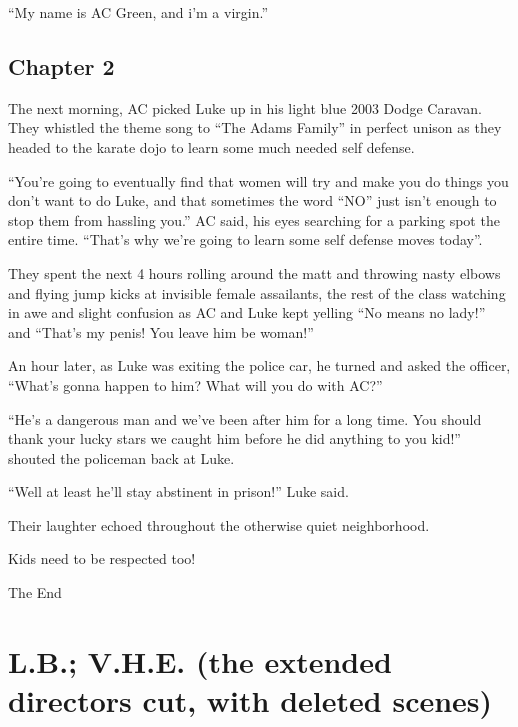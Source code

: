 ``My name is AC Green, and i'm a virgin.''



\section*{Chapter 2}

The next morning, AC picked Luke up in his light blue 2003 Dodge
Caravan. They whistled the theme song to ``The Adams
Family'' in perfect unison as they headed to the karate dojo
to learn some much needed self defense.



``You're going to eventually find that women will try
and make you do things you don't want to do Luke, and that
sometimes the word ``NO'' just isn't enough to stop
them from hassling you.'' AC said, his eyes searching for a
parking spot the entire time. ``That's why we're
going to learn some self defense moves today''.



They spent the next 4 hours rolling around the matt and throwing
nasty elbows and flying jump kicks at invisible female assailants,
the rest of the class watching in awe and slight confusion as AC
and Luke kept yelling ``No means no lady!'' and
``That's my penis! You leave him be woman!''



An hour later, as Luke was exiting the police car, he turned and
asked the officer, ``What's gonna happen to him? What
will you do with AC?''



``He's a dangerous man and we've been after him for a long
time. You should thank your lucky stars we caught him before he did
anything to you kid!'' shouted the policeman back at
Luke.



``Well at least he'll stay abstinent in prison!''
Luke said.



Their laughter echoed throughout the otherwise quiet
neighborhood.



Kids need to be respected too!

The End
 



\chapter[L.B.; V.H.E.]{L.B.; V.H.E. (the extended directors cut,
with deleted scenes)}


